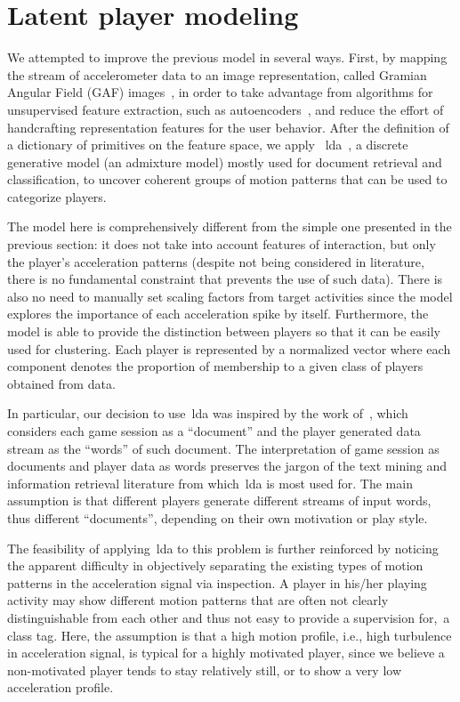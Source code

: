 \section{Latent player modeling}

We attempted to improve the previous model in several ways. First, by mapping the stream of accelerometer data to an image representation, called Gramian Angular Field (GAF) images~\citep{wang_imaging_2015}, in order to take advantage from algorithms for unsupervised feature extraction, such as autoencoders~\citep{goodfellow_deep_2016}, and reduce the effort of handcrafting representation features for the user behavior. After the definition of a dictionary of primitives on the feature space, we apply ~\gls{lda}~\citep{blei_latent_2003}, a discrete generative model (an admixture model) mostly used for document retrieval and classification, to uncover coherent groups of motion patterns that can be used to categorize players.

The model here is comprehensively different from the simple one presented in the previous section: it does not take into account features of interaction, but only the player's acceleration patterns (despite not being considered in literature, there is no fundamental constraint that prevents the use of such data). There is also no need to manually set scaling factors from target activities since the model explores the importance of each acceleration spike by itself. Furthermore, the model is able to provide the distinction between players so that it can be easily used for clustering. Each player is represented by a normalized vector where each component denotes the proportion of membership to a given class of players obtained from data.

In particular, our decision to use~\gls{lda} was inspired by the work of~\cite{smith_mining_2016}, which considers each game session as a ``document'' and the player generated data stream as the ``words'' of such document. The interpretation of game session as documents and player data as words preserves the jargon of the text mining and information retrieval literature from which~\gls{lda} is most used for. The main assumption is that different players generate different streams of input words, thus different ``documents'', depending on their own motivation or play style. 

The feasibility of applying~\gls{lda} to this problem is further reinforced by noticing the apparent difficulty in objectively separating the existing types of motion patterns in the acceleration signal via inspection. A player in his/her playing activity may show different motion patterns that are often not clearly distinguishable from each other and thus not easy to provide a supervision for,~\ie a class tag. Here, the assumption is that a high motion profile, i.e., high turbulence in acceleration signal, is typical for a highly motivated player, since we believe a non-motivated player tends to stay relatively still, or to show a very low acceleration profile.

